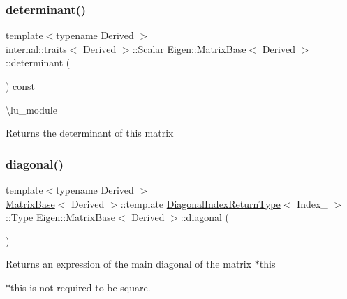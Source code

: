 \subsubsection{\texorpdfstring{determinant()}{determinant()}}
{\footnotesize\ttfamily template$<$typename Derived $>$ \\
\mbox{\hyperlink{struct_eigen_1_1internal_1_1traits}{internal\+::traits}}$<$ Derived $>$\+::\mbox{\hyperlink{class_eigen_1_1_dense_base_a5feed465b3a8e60c47e73ecce83e39a2}{Scalar}} \mbox{\hyperlink{class_eigen_1_1_matrix_base}{Eigen\+::\+Matrix\+Base}}$<$ Derived $>$\+::determinant (\begin{DoxyParamCaption}{ }\end{DoxyParamCaption}) const\hspace{0.3cm}{\ttfamily [inline]}}

\textbackslash{}lu\+\_\+module

\begin{DoxyReturn}{Returns}
the determinant of this matrix 
\end{DoxyReturn}
\mbox{\label{class_eigen_1_1_matrix_base_ab5768147536273eb2dbdfa389cfd26a3}} 
\subsubsection{\texorpdfstring{diagonal()}{diagonal()}\hspace{0.1cm}{\footnotesize\ttfamily [1/4]}}
{\footnotesize\ttfamily template$<$typename Derived $>$ \\
\mbox{\hyperlink{class_eigen_1_1_matrix_base}{Matrix\+Base}}$<$ Derived $>$\+::template \mbox{\hyperlink{struct_eigen_1_1_matrix_base_1_1_diagonal_index_return_type}{Diagonal\+Index\+Return\+Type}}$<$ Index\+\_\+ $>$\+::Type \mbox{\hyperlink{class_eigen_1_1_matrix_base}{Eigen\+::\+Matrix\+Base}}$<$ Derived $>$\+::diagonal (\begin{DoxyParamCaption}{ }\end{DoxyParamCaption})\hspace{0.3cm}{\ttfamily [inline]}}

\begin{DoxyReturn}{Returns}
an expression of the main diagonal of the matrix {\ttfamily $\ast$this} 
\end{DoxyReturn}
{\ttfamily $\ast$this} is not required to be square.

